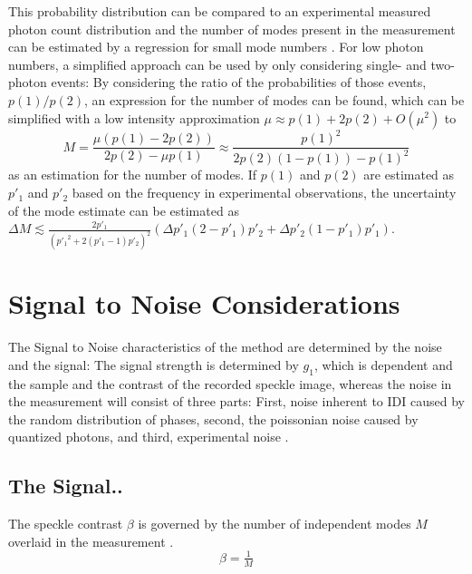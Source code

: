 This probability distribution can be compared to an experimental measured photon count distribution and the number of modes present in the measurement can be estimated by a regression for small mode numbers \cite{lehmkuhler2014,yun2019}. 
For low photon numbers, a simplified approach can be used by only considering single- and two-photon events: By considering the ratio of the probabilities of those events, $p(1) / p(2)$,  an expression for the number of modes can be found, which can be simplified with a low intensity approximation $\mu\approx p(1)+2p(2)+O(\mu^2)$ to 
\begin{equation}
	M=\frac{\mu  (p(1)-2 p(2))}{2 p(2)-\mu  p(1)}\approx \frac{p(1)^2}{2 p(2) (1-p(1))-p(1)^2}
	\label{eq:modesp1p2}
\end{equation}
as an estimation for the number of modes.
If $p(1)$ and $p(2)$ are estimated as $p'_1$ and $p'_2$ based on the frequency in experimental observations, the uncertainty of the mode estimate can be estimated as 
$\Delta M \lesssim \frac{2 p'_1}{\left({p'_1}^2+2 (p'_1-1) p'_2\right)^2} \left(\Delta p'_1 (2-p'_1) p'_2+\Delta p'_2 (1-p'_1) p'_1\right)$.



\section{Signal to Noise Considerations}

The Signal to Noise characteristics of the method are determined by the noise and the signal:
The signal strength is determined by $g_1$, which is dependent and the sample and the contrast of the recorded speckle image, whereas the noise in the measurement will consist of three parts: First, noise inherent to IDI caused by the random distribution of phases, second, the poissonian noise caused by quantized photons, and third, experimental noise \cite{trost2020, goodman2007}. 

\subsection{The Signal..}
The speckle contrast $\beta$ is governed by the number of independent modes $M$ overlaid in the measurement \cite{goodman2000}.
\begin{equation}
\beta =\tfrac{1}{M}
\end{equation}


